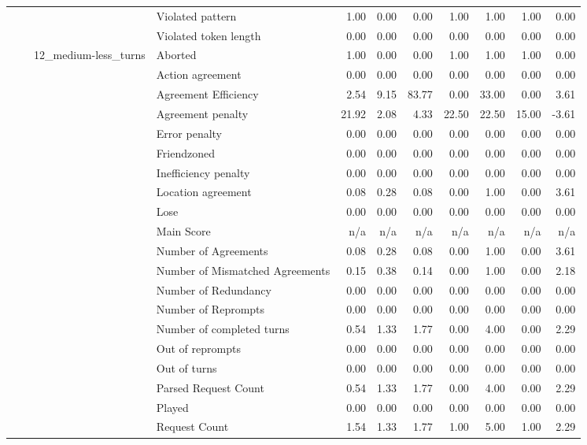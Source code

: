 \begin{tabular}{llllrrrrrrr}
 &  &  & Violated pattern & 1.00 & 0.00 & 0.00 & 1.00 & 1.00 & 1.00 & 0.00 \\
 &  &  & Violated token length & 0.00 & 0.00 & 0.00 & 0.00 & 0.00 & 0.00 & 0.00 \\
\cline{3-11}
 &  & \multirow[t]{27}{*}{12_medium-less_turns} & Aborted & 1.00 & 0.00 & 0.00 & 1.00 & 1.00 & 1.00 & 0.00 \\
 &  &  & Action agreement & 0.00 & 0.00 & 0.00 & 0.00 & 0.00 & 0.00 & 0.00 \\
 &  &  & Agreement Efficiency & 2.54 & 9.15 & 83.77 & 0.00 & 33.00 & 0.00 & 3.61 \\
 &  &  & Agreement penalty & 21.92 & 2.08 & 4.33 & 22.50 & 22.50 & 15.00 & -3.61 \\
 &  &  & Error penalty & 0.00 & 0.00 & 0.00 & 0.00 & 0.00 & 0.00 & 0.00 \\
 &  &  & Friendzoned & 0.00 & 0.00 & 0.00 & 0.00 & 0.00 & 0.00 & 0.00 \\
 &  &  & Inefficiency penalty & 0.00 & 0.00 & 0.00 & 0.00 & 0.00 & 0.00 & 0.00 \\
 &  &  & Location agreement & 0.08 & 0.28 & 0.08 & 0.00 & 1.00 & 0.00 & 3.61 \\
 &  &  & Lose & 0.00 & 0.00 & 0.00 & 0.00 & 0.00 & 0.00 & 0.00 \\
 &  &  & Main Score & n/a & n/a & n/a & n/a & n/a & n/a & n/a \\
 &  &  & Number of Agreements & 0.08 & 0.28 & 0.08 & 0.00 & 1.00 & 0.00 & 3.61 \\
 &  &  & Number of Mismatched Agreements & 0.15 & 0.38 & 0.14 & 0.00 & 1.00 & 0.00 & 2.18 \\
 &  &  & Number of Redundancy & 0.00 & 0.00 & 0.00 & 0.00 & 0.00 & 0.00 & 0.00 \\
 &  &  & Number of Reprompts & 0.00 & 0.00 & 0.00 & 0.00 & 0.00 & 0.00 & 0.00 \\
 &  &  & Number of completed turns & 0.54 & 1.33 & 1.77 & 0.00 & 4.00 & 0.00 & 2.29 \\
 &  &  & Out of reprompts & 0.00 & 0.00 & 0.00 & 0.00 & 0.00 & 0.00 & 0.00 \\
 &  &  & Out of turns & 0.00 & 0.00 & 0.00 & 0.00 & 0.00 & 0.00 & 0.00 \\
 &  &  & Parsed Request Count & 0.54 & 1.33 & 1.77 & 0.00 & 4.00 & 0.00 & 2.29 \\
 &  &  & Played & 0.00 & 0.00 & 0.00 & 0.00 & 0.00 & 0.00 & 0.00 \\
 &  &  & Request Count & 1.54 & 1.33 & 1.77 & 1.00 & 5.00 & 1.00 & 2.29 \\

\end{tabular}
